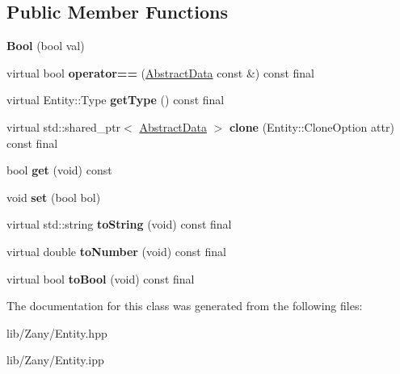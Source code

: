 \subsection*{Public Member Functions}
\begin{DoxyCompactItemize}
\item 
\mbox{\label{classzany_1_1_bool_a5a5a047c80dd54288652c9c094b8124a}} 
{\bfseries Bool} (bool val)
\item 
\mbox{\label{classzany_1_1_bool_a2cbdbdc6c4f4afe3a713d59532e6719f}} 
virtual bool {\bfseries operator==} (\hyperlink{classzany_1_1_abstract_data}{Abstract\+Data} const \&) const final
\item 
\mbox{\label{classzany_1_1_bool_a031f5070411fb3ecc12d7751638aecc7}} 
virtual Entity\+::\+Type {\bfseries get\+Type} () const final
\item 
\mbox{\label{classzany_1_1_bool_a080f1bc0d0c40cc2d0fccce9303fee15}} 
virtual std\+::shared\+\_\+ptr$<$ \hyperlink{classzany_1_1_abstract_data}{Abstract\+Data} $>$ {\bfseries clone} (Entity\+::\+Clone\+Option attr) const final
\item 
\mbox{\label{classzany_1_1_bool_ab22cb976dfb04df116b7c50445fbc665}} 
bool {\bfseries get} (void) const
\item 
\mbox{\label{classzany_1_1_bool_af7f717ecca4947042e1ba8b882a3ca96}} 
void {\bfseries set} (bool bol)
\item 
\mbox{\label{classzany_1_1_bool_a9e0157b65d607532c24c079e9a74e911}} 
virtual std\+::string {\bfseries to\+String} (void) const final
\item 
\mbox{\label{classzany_1_1_bool_a9879d95ad6a6478ef3f6042725aa03c8}} 
virtual double {\bfseries to\+Number} (void) const final
\item 
\mbox{\label{classzany_1_1_bool_afd5e380b7f719a904814622e743ad62b}} 
virtual bool {\bfseries to\+Bool} (void) const final
\end{DoxyCompactItemize}


The documentation for this class was generated from the following files\+:\begin{DoxyCompactItemize}
\item 
lib/\+Zany/Entity.\+hpp\item 
lib/\+Zany/Entity.\+ipp\end{DoxyCompactItemize}
